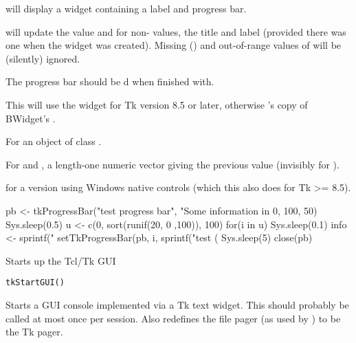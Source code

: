 %
\begin{Details}\relax
{} will display a widget containing a label and
progress bar.

 will update the value and for non-
values, the title and label (provided there was one when the widget
was created).  Missing () and out-of-range values of
 will be (silently) ignored.

The progress bar should be d when finished with.

This will use the  widget for Tk version 8.5 or
later, otherwise \R{}'s copy of BWidget's .
\end{Details}
%
\begin{Value}
For  an object of class .

For  and , a
length-one numeric vector giving the previous value (invisibly for
).
\end{Value}
%
\begin{SeeAlso}\relax
{}  

 for a version using Windows native
controls (which this also does for Tk >= 8.5).
\end{SeeAlso}
%
\begin{Examples}
\begin{ExampleCode}

pb <- tkProgressBar("test progress bar", "Some information in %
                    0, 100, 50)
Sys.sleep(0.5)
u <- c(0, sort(runif(20, 0 ,100)), 100)
for(i in u) {
    Sys.sleep(0.1)
    info <- sprintf("%
    setTkProgressBar(pb, i, sprintf("test (%
}
Sys.sleep(5)
close(pb)
\end{ExampleCode}
\end{Examples}
%
\begin{Description}\relax
Starts up the Tcl/Tk GUI
\end{Description}
%
\begin{Usage}
\begin{verbatim}
tkStartGUI()
\end{verbatim}
\end{Usage}
%
\begin{Details}\relax
Starts a GUI console implemented via a Tk text widget. This should
probably be called at most once per session. Also redefines the file
pager (as used by ) to be the Tk pager. 
\end{Details}
